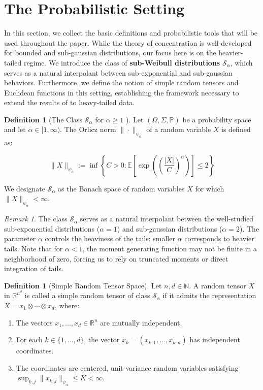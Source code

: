 \documentclass[11pt]{amsart}
\theoremstyle{definition}
\newtheorem{definition}[theorem]{Definition}
\theoremstyle{remark}
\newtheorem*{remark}{Remark}
\begin{document}
\section{The Probabilistic Setting}

In this section, we collect the basic definitions and probabilistic tools that will be used throughout the paper. While the theory of concentration is well-developed for bounded and sub-gaussian distributions, our focus here is on the heavier-tailed regime. We introduce the class of \textbf{sub-Weibull distributions} $\mathcal{S}_\alpha$, which serves as a natural interpolant between sub-exponential and sub-gaussian behaviors. Furthermore, we define the notion of simple random tensors and Euclidean functions in this setting, establishing the framework necessary to extend the results of \cite{Vershynin2020} to heavy-tailed data.

\begin{definition}[The Class $\mathcal{S}_\alpha$ for $\alpha \geq 1$ ]\label{def:2.1}
Let $(\Omega, \Sigma, \mathbb{P})$ be a probability space and let $\alpha \in [1, \infty)$. The Orlicz norm $\|\cdot\|_{\psi_\alpha}$ of a random variable $X$ is defined as:

\begin{equation}
\|X\|_{\psi_\alpha}:=\inf \left\{C>0: \mathbb{E}\left[\exp \left(\left(\frac{|X|}{C}\right)^\alpha\right)\right] \leq 2\right\}
\end{equation}

We designate $\mathcal{S}_\alpha$ as the Banach space of random variables $X$ for which $\|X\|_{\psi_\alpha}<\infty$.
\end{definition}

\begin{remark}
The class $\mathcal{S}_{\alpha}$ serves as a natural interpolant between the well-studied sub-exponential distributions ($\alpha=1$) and sub-gaussian distributions ($\alpha=2$). The parameter $\alpha$ controls the heaviness of the tails: smaller $\alpha$ corresponds to heavier tails. Note that for $\alpha < 1$, the moment generating function may not be finite in a neighborhood of zero, forcing us to rely on truncated moments or direct integration of tails.
\end{remark}

\begin{definition}[Simple Random Tensor Space]\label{def:2.2}
Let $n, d \in \mathbb{N}$. A random tensor $X$ in $\mathbb{R}^{n^d}$ is called a simple random tensor of class $\mathcal{S}_\alpha$ if it admits the representation $X = x_1 \otimes \cdots \otimes x_d$, where:
\begin{enumerate}
    \item The vectors $x_1, \dots, x_d \in \mathbb{R}^n$ are mutually independent.
    \item For each $k \in \{1, \dots, d\}$, the vector $x_k = (x_{k,1}, \dots, x_{k,n})$ has independent coordinates.
    \item The coordinates are centered, unit-variance random variables satisfying $\sup_{k,j} \|x_{k,j}\|_{\psi_\alpha} \leq K < \infty$.
\end{enumerate}
\end{definition}
\end{document}
